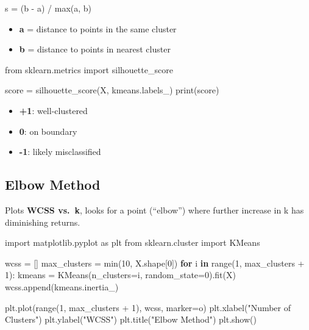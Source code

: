 \documentclass[
  letterpaper,
  DIV=11,
  numbers=noendperiod]{scrreprt}
\newenvironment{Shaded}{\begin{snugshade}}{\end{snugshade}}
\newcommand{\BuiltInTok}[1]{\textcolor[rgb]{0.00,0.23,0.31}{#1}}
\newcommand{\ControlFlowTok}[1]{\textcolor[rgb]{0.00,0.23,0.31}{\textbf{#1}}}
\newcommand{\DecValTok}[1]{\textcolor[rgb]{0.68,0.00,0.00}{#1}}
\newcommand{\ImportTok}[1]{\textcolor[rgb]{0.00,0.46,0.62}{#1}}
\newcommand{\KeywordTok}[1]{\textcolor[rgb]{0.00,0.23,0.31}{\textbf{#1}}}
\newcommand{\NormalTok}[1]{\textcolor[rgb]{0.00,0.23,0.31}{#1}}
\newcommand{\OperatorTok}[1]{\textcolor[rgb]{0.37,0.37,0.37}{#1}}
\newcommand{\StringTok}[1]{\textcolor[rgb]{0.13,0.47,0.30}{#1}}
\providecommand{\tightlist}{%
  \setlength{\itemsep}{0pt}\setlength{\parskip}{0pt}}\usepackage{longtable,booktabs,array}
\begin{document}
s = (b - a) / max(a, b)

\begin{itemize}
\tightlist
\item
  \textbf{a} = distance to points in the same cluster
\item
  \textbf{b} = distance to points in nearest cluster
\end{itemize}

\begin{Shaded}
\begin{Highlighting}[]
\ImportTok{from}\NormalTok{ sklearn.metrics }\ImportTok{import}\NormalTok{ silhouette\_score}

\NormalTok{score }\OperatorTok{=}\NormalTok{ silhouette\_score(X, kmeans.labels\_)}
\BuiltInTok{print}\NormalTok{(score)}
\end{Highlighting}
\end{Shaded}

\begin{itemize}
\tightlist
\item
  \textbf{+1}: well-clustered
\item
  \textbf{0}: on boundary
\item
  \textbf{-1}: likely misclassified
\end{itemize}

\subsection{Elbow Method}\label{elbow-method}

Plots \textbf{WCSS vs.~k}, looks for a point (``elbow'') where further
increase in k has diminishing returns.

\begin{Shaded}
\begin{Highlighting}[]
\ImportTok{import}\NormalTok{ matplotlib.pyplot }\ImportTok{as}\NormalTok{ plt}
\ImportTok{from}\NormalTok{ sklearn.cluster }\ImportTok{import}\NormalTok{ KMeans}


\NormalTok{wcss }\OperatorTok{=}\NormalTok{ []}
\NormalTok{max\_clusters }\OperatorTok{=} \BuiltInTok{min}\NormalTok{(}\DecValTok{10}\NormalTok{, X.shape[}\DecValTok{0}\NormalTok{]) }
\ControlFlowTok{for}\NormalTok{ i }\KeywordTok{in} \BuiltInTok{range}\NormalTok{(}\DecValTok{1}\NormalTok{, max\_clusters }\OperatorTok{+} \DecValTok{1}\NormalTok{):}
\NormalTok{    kmeans }\OperatorTok{=}\NormalTok{ KMeans(n\_clusters}\OperatorTok{=}\NormalTok{i, random\_state}\OperatorTok{=}\DecValTok{0}\NormalTok{).fit(X)}
\NormalTok{    wcss.append(kmeans.inertia\_)}

\NormalTok{plt.plot(}\BuiltInTok{range}\NormalTok{(}\DecValTok{1}\NormalTok{, max\_clusters }\OperatorTok{+} \DecValTok{1}\NormalTok{), wcss, marker}\OperatorTok{=}\StringTok{\textquotesingle{}o\textquotesingle{}}\NormalTok{)}
\NormalTok{plt.xlabel(}\StringTok{"Number of Clusters"}\NormalTok{)}
\NormalTok{plt.ylabel(}\StringTok{"WCSS"}\NormalTok{)}
\NormalTok{plt.title(}\StringTok{"Elbow Method"}\NormalTok{)}
\NormalTok{plt.show()}
\end{Highlighting}
\end{Shaded}
\end{document}
